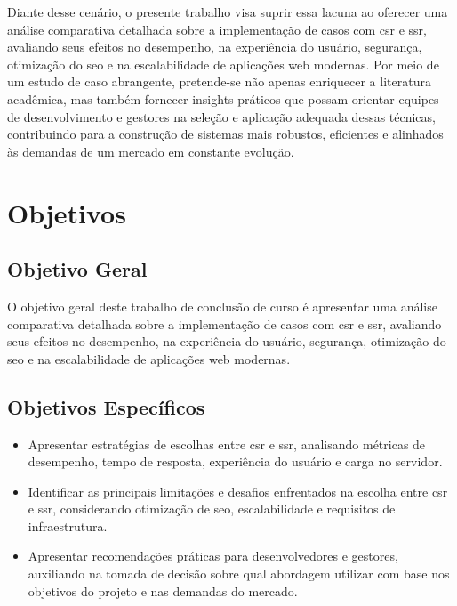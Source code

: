 Diante desse cenário, o presente trabalho visa suprir essa lacuna ao oferecer uma análise comparativa detalhada sobre a implementação de casos com \acrshort{csr} e \acrshort{ssr}, avaliando seus efeitos no desempenho, na experiência do usuário, segurança, otimização do \acrshort{seo} e na escalabilidade de aplicações web modernas. Por meio de um estudo de caso abrangente, pretende-se não apenas enriquecer a literatura acadêmica, mas também fornecer insights práticos que possam orientar equipes de desenvolvimento e gestores na seleção e aplicação adequada dessas técnicas, contribuindo para a construção de sistemas mais robustos, eficientes e alinhados às demandas de um mercado em constante evolução.

\section{Objetivos}

\subsection{Objetivo Geral}

O objetivo geral deste trabalho de conclusão de curso é apresentar uma análise comparativa detalhada sobre a implementação de casos com \acrshort{csr} e \acrshort{ssr}, avaliando seus efeitos no desempenho, na experiência do usuário, segurança, otimização do \acrshort{seo} e na escalabilidade de aplicações web modernas. 

\subsection{Objetivos Específicos}
\begin{itemize}
\item Apresentar estratégias de escolhas entre \acrshort{csr} e \acrshort{ssr}, analisando métricas de desempenho, tempo de resposta, experiência do usuário e carga no servidor.
\item Identificar as principais limitações e desafios enfrentados na escolha entre \acrshort{csr} e \acrshort{ssr}, considerando otimização de \acrshort{seo}, escalabilidade e requisitos de infraestrutura.
\item Apresentar recomendações práticas para desenvolvedores e gestores, auxiliando na tomada de decisão sobre qual abordagem utilizar com base nos objetivos do projeto e nas demandas do mercado.
\end{itemize}

